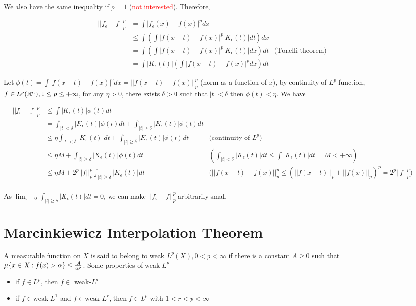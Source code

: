 \documentclass{report}
\begin{document}
We also have the same inequality if $p = 1$ (\textcolor{red}{not interested}). Therefore,

\begin{align*}
    ||f_\epsilon - f||_p^p
    &= \int |f_\epsilon(x) - f(x)|^p dx \\
    &\leq \int \left( \int |f(x-t) - f(x)|^p |K_\epsilon(t)| dt \right) dx \\
    &= \int \left( \int |f(x-t) - f(x)|^p |K_\epsilon(t)| dx \right) dt &\text{(Tonelli theorem)} \\
    &= \int |K_\epsilon(t)| \left( \int |f(x-t) - f(x)|^p  dx \right) dt
\end{align*}

Let $\phi(t) = \int |f(x-t) - f(x)|^p  dx = || f(x - t) - f(x) ||_p^p$ (norm as a function of $x$), by continuity of $L^p$ function, $f \in L^p(\mathbb{R}^n), 1 \leq p \leq +\infty$, for any $\eta > 0$, there exists $\delta > 0$ such that $|t| < \delta$ then $\phi(t) < \eta$. We have

\begin{align*}
    ||f_\epsilon - f||_p^p
    &\leq \int |K_\epsilon(t)| \phi(t) dt \\
    &= \int_{|t| < \delta} |K_\epsilon(t)| \phi(t) dt + \int_{|t| \geq \delta} |K_\epsilon(t)| \phi(t) dt \\
    &\leq \eta \int_{|t| < \delta} |K_\epsilon(t)| dt + \int_{|t| \geq \delta} |K_\epsilon(t)| \phi(t) dt &\text{(continuity of $L^p$)} \\
    &\leq \eta M + \int_{|t| \geq \delta} |K_\epsilon(t)| \phi(t) dt &\text{$\left(\int_{|t| < \delta} |K_\epsilon(t)| dt \leq \int |K_\epsilon(t)| dt = M < +\infty \right)$} \\
    &\leq \eta M + 2^p||f||_p^p \int_{|t| \geq \delta} |K_\epsilon(t)| dt &\text{($|| f(x - t) - f(x) ||_p^p \leq (||f(x-t)||_p + ||f(x)||_p)^p = 2^p||f||_p^p$)} \\
\end{align*}

As $\lim_{\epsilon \to 0} \int_{|t| \geq \delta} |K_\epsilon(t)| dt = 0$, we can make $||f_\epsilon - f||_p^p$ arbitrarily small

\section{Marcinkiewicz Interpolation Theorem}

\begin{definition}[Weak-$L^p$]
    A measurable function on $X$ is said to belong to weak $L^p(X), 0 < p < \infty$ if there is a constant $A \geq 0$ such that $\mu \{x \in X: f(x) > \alpha\} \leq \frac{A}{\alpha^p}$.
    Some properties of weak $L^p$
    \begin{itemize}
        \item if $f \in L^p$, then $f \in$ weak-$L^p$
        \item if $f \in \text{weak }L^1$ and $f \in \text{weak }L^r$, then $f \in L^p$ with $1 < r < p < \infty$
    \end{itemize}
\end{definition}
\end{document}
